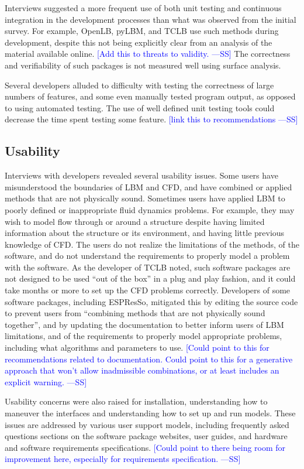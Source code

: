 \documentclass[final, 3p, times, authoryear]{elsarticle}
\newcommand{\authornote}[3]{\textcolor{#1}{[#3 ---#2]}}
\newcommand{\authornote}[3]{}
\newcommand{\wss}[1]{\authornote{blue}{SS}{#1}} %
\begin{document}
Interviews suggested a more frequent use of both unit testing and continuous
integration in the development processes than what was observed from the initial
survey. For example, OpenLB, pyLBM, and TCLB use such methods during development,
despite this not being explicitly clear from an analysis of the material
available online. \wss{Add this to threats to validity.}  The correctness and
verifiability of such packages is not measured well using surface analysis.

Several developers alluded to difficulty with testing the correctness of large
numbers of features, and some even manually tested program output, as opposed to
using automated testing. The use of well defined unit testing tools could
decrease the time spent testing some feature.  \wss{link this to
recommendations}

\subsection{Usability}

Interviews with developers revealed several usability issues. Some users have
misunderstood the boundaries of LBM and CFD, and have combined or applied
methods that are not physically sound. Sometimes users have applied LBM to
poorly defined or inappropriate fluid dynamics problems. For example, they may
wish to model flow through or around a structure despite having limited
information about the structure or its environment, and having little previous
knowledge of CFD. The users do not realize the limitations of the methods, of
the software, and do not understand the requirements to properly model a problem
with the software. As the developer of TCLB noted, such software packages are
not designed to be used ``out of the box'' in a plug and play fashion, and it
could take months or more to set up the CFD problems correctly. Developers of
some software packages, including ESPResSo, mitigated this by editing the source
code to prevent users from ``combining methods that are not physically sound
together'', and by updating the documentation to better inform users of LBM
limitations, and of the requirements to properly model appropriate problems,
including what algorithms and parameters to use.  \wss{Could point to this for
recommendations related to documentation.  Could point to this for a generative
approach that won't allow inadmissible combinations, or at least includes an
explicit warning.}

Usability concerns were also raised for installation, understanding how to
maneuver the interfaces and understanding how to set up and run models. These
issues are addressed by various user support models, including frequently asked
questions sections on the software package websites, user guides, and hardware
and software requirements specifications.  \wss{Could point to there being room
for improvement here, especially for requirements specification.}
\end{document}

